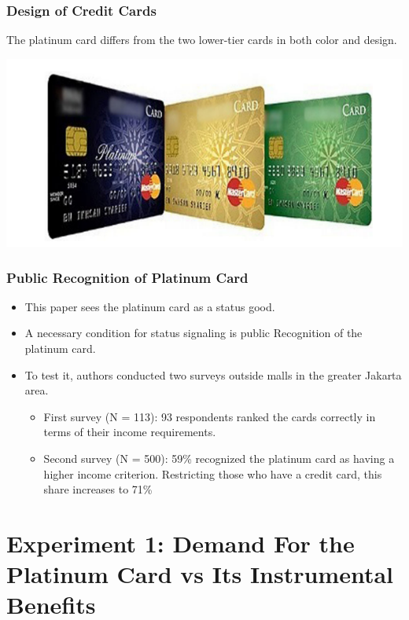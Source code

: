 \documentclass[unicode,12pt]{beamer}
\begin{document}
    \begin{frame}
        \frametitle{Design of Credit Cards}

        The platinum card differs from the two lower-tier cards in both color and design.
    
        \centerline{\includegraphics[width = \linewidth]{0717kato/creca.PNG}}
    
    \end{frame}

    \begin{frame}
        \frametitle{Public Recognition of Platinum Card}
    
        \begin{itemize}
            \item This paper sees the platinum card as a status good.
            \item A necessary condition for status signaling is public Recognition of the platinum card.
            \item To test it, authors conducted two surveys outside malls in the greater Jakarta area.
            \begin{itemize}
                \item First survey (N = 113): 93 respondents ranked the cards correctly in terms of their income requirements.
                \item Second survey (N = 500): 59\% recognized the platinum card as having a higher income criterion. Restricting those who have a credit card, this share increases to 71\%
            \end{itemize}
        \end{itemize}
    
    \end{frame}

    \section{Experiment 1: Demand For the Platinum Card vs Its Instrumental Benefits}
\end{document}
